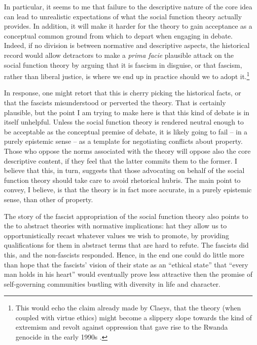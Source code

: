 In particular, it seems to me that failure to  the descriptive nature of the core idea can lead to unrealistic expectations of what the social function theory actually provides. In addition, it will make it harder for the theory to gain acceptance as a conceptual common ground from which to depart when engaging in debate. Indeed, if no division is  between normative and descriptive aspects, the historical record would allow detractors to make a {\it prima facie} plausible attack on the social function theory by arguing that it is fascism in disguise, or that fascism, rather than liberal justice, is where we end up in practice should we  to adopt it.\footnote{This would echo the claim already made by Claeys, that the theory (when coupled with virtue ethics) might become a slippery slope towards the kind of extremism and revolt against oppression that gave rise to the Rwanda genocide in the early 1990s \cite[926-927]{claeys09}.}

In response, one might retort that this is cherry picking the historical facts, or that the fascists misunderstood or perverted the theory. That is certainly plausible, but the point I am trying to make here is that this kind of debate is in itself unhelpful. Unless the social function theory is rendered neutral enough to be acceptable as the conceptual premise of debate, it is likely going to fail -- in a purely epistemic sense -- as a template for negotiating conflicts about property. Those who oppose the norms associated with the theory will oppose also the core descriptive content, if they feel that the latter commits them to the former. I believe that this, in turn, suggests that those advocating on behalf of the social function theory should take care to avoid rhetorical hubris. The main point to convey, I believe, is that the theory is in fact more accurate, in a purely epistemic sense, than other  of property.

The story of the fascist appropriation of the social function theory also points to the  to abstract theories with normative implications: hat they allow us to opportunistically recast whatever values we wish to promote, by providing qualifications for them in abstract terms that are hard to refute. The fascists did this, and the non-fascists responded. Hence, in the end one could do little more than hope that the fascists' vision of their state as an ``ethical state'' that ``every man holds in his heart'' would eventually prove less attractive then the promise of self-governing communities bustling with diversity in life and character.

